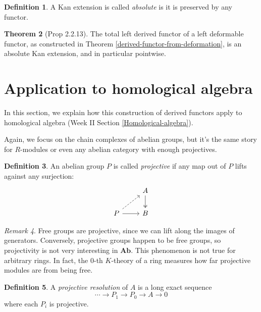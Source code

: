 \documentclass[11pt]{article}
\theoremstyle{definition}
\newtheorem{theorem}{Theorem}[part]
\newtheorem{definition}[theorem]{Definition}
\theoremstyle{remark}
\newtheorem{remark}[theorem]{Remark}
\newcommand{\Ab}{\mathbf{Ab}}
\begin{document}
\begin{definition}
    A Kan extension is called \emph{absolute} is it is preserved by any functor.
\end{definition}

\begin{theorem}[Prop 2.2.13]
    The total left derived functor of a left deformable functor, as constructed in Theorem \ref{derived-functor-from-deformation},
    is an absolute Kan extension, and in particular pointwise. 
\end{theorem}

\section{Application to homological algebra}
In this section, we explain how this construction of derived functors
apply to homological algebra (Week II Section \ref{Homological-algebra}).

Again, we focus on the chain complexes of abelian groups,
but it's the same story for $R$-modules or even any abelian category with enough projectives.

\begin{definition}
    An abelian group $P$ is called \emph{projective} if any map out of $P$ lifts against any surjection:
    \[
        \begin{tikzcd}
            & A \arrow[d, twoheadrightarrow] \\
            P \arrow[r] \arrow[ur, dashed] & B
        \end{tikzcd}
    \]
\end{definition}

\begin{remark}
    Free groups are projective, since we can lift along the images of generators.
    Conversely, projective groups happen to be free groups, so projectivity is not very interesting in $\Ab$.
    This phenomenon is not true for arbitrary rings. In fact, the 0-th $K$-theory of a ring measures
    how far projective modules are from being free.
\end{remark}

\begin{definition}
    A \emph{projective resolution} of $A$ is a long exact sequence
    \[
        \cdots \to P_1 \to P_0 \to A \to 0
    \]
    where each $P_i$ is projective.
\end{definition}
\end{document}
